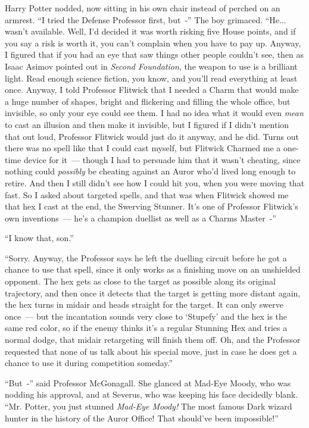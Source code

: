 Harry Potter nodded, now sitting in his own chair instead of perched on an armrest. ``I tried the Defense Professor first, but~-'' The boy grimaced. ``He... wasn't available. Well, I'd decided it was worth risking five House points, and if you say a risk is worth it, you can't complain when you have to pay up. Anyway, I figured that if you had an eye that saw things other people couldn't see, then as Isaac Asimov pointed out in \emph{Second Foundation}, the weapon to use is a brilliant light. Read enough science fiction, you know, and you'll read everything at least once. Anyway, I told Professor Flitwick that I needed a Charm that would make a huge number of shapes, bright and flickering and filling the whole office, but invisible, so only your eye could see them. I had no idea what it would even \emph{mean} to cast an illusion and then make it invisible, but I figured if I didn't mention that out loud, Professor Flitwick would just do it anyway, and he did. Turns out there was no spell like that I could cast myself, but Flitwick Charmed me a one-time device for it~--- though I had to persuade him that it wasn't cheating, since nothing could \emph{possibly} be cheating against an Auror who'd lived long enough to retire. And then I still didn't see how I could hit you, when you were moving that fast. So I asked about targeted spells, and that was when Flitwick showed me that hex I cast at the end, the Swerving Stunner. It's one of Professor Flitwick's own inventions~--- he's a champion duellist as well as a Charms Master~-''

``I know that, son.''

``Sorry. Anyway, the Professor says he left the duelling circuit before he got a chance to use that spell, since it only works as a finishing move on an unshielded opponent. The hex gets as close to the target as possible along its original trajectory, and then once it detects that the target is getting more distant again, the hex turns in midair and heads straight for the target. It can only swerve once~--- but the incantation sounds very close to `Stupefy' and the hex is the same red color, so if the enemy thinks it's a regular Stunning Hex and tries a normal dodge, that midair retargeting will finish them off. Oh, and the Professor requested that none of us talk about his special move, just in case he does get a chance to use it during competition someday.''

``But~-'' said Professor McGonagall. She glanced at Mad-Eye Moody, who was nodding his approval, and at Severus, who was keeping his face decidedly blank. ``Mr. Potter, you just stunned \emph{Mad-Eye Moody!} The most famous Dark wizard hunter in the history of the Auror Office! That should've been impossible!''

